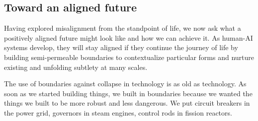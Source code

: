 \documentclass[12pt]{article}
\begin{document}






\subsection{Toward an aligned future}
\label{sec:toward}



Having explored misalignment from the standpoint of life, we now ask what a positively aligned future might look like and how we can achieve it. As human-AI systems develop, they will stay aligned if they continue the journey of life by building semi-permeable boundaries to contextualize particular forms and nurture existing and unfolding subtlety at many scales. 

The use of boundaries against collapse in technology is as old as technology. As soon as we started building things, we built in boundaries because we wanted the things we built to be more robust and less dangerous. We put circuit breakers in the power grid, governors in steam engines, control rods in fission reactors. 
\end{document}
